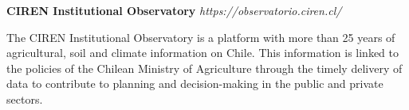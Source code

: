 \item
\headerrow
{\textbf{CIREN Institutional Observatory}}
{\emph{https://observatorio.ciren.cl/}}
\begin{itemize*}
    \item The CIREN Institutional Observatory is a platform with more than 25 years 
    of agricultural, soil and climate information on Chile. This information is linked 
    to the policies of the Chilean Ministry of Agriculture through the timely delivery of 
    data to contribute to planning and decision-making in the public and private sectors.
\end{itemize*}